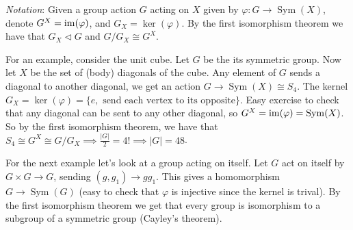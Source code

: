 \documentclass{article}
\newcommand{\nrm}{\triangleleft}
\DeclareMathOperator{\sym}{Sym}
\begin{document}
\par
\par \textit{Notation}: Given a group action $ G $ acting on $ X $ given by $ \varphi:G\to\sym(X) $, denote $ G^X=\operatorname{im}(\varphi) $, and $ G_X=\ker(\varphi) $. By the first isomorphism theorem we have that $ G_X\nrm G $ and $ G/G_X\cong G^X $.

\par
For an example, consider the unit cube. Let $ G $ be the its symmetric group. Now let $ X $ be the set of (body) diagonals of the cube. Any element of $ G $ sends a diagonal to another diagonal, we get an action $ G\to\sym(X)\cong S_4 $. The kernel $ G_X=\ker(\varphi)=\{e, \text{ send each vertex to its opposite} \} $. Easy exercise to check that any diagonal can be sent to any other diagonal, so $ G^X=\ima (\varphi)=\sym(X) $. So by the first isomorphism theorem, we have that $ S_4\cong G^X\cong G/G_X\implies \frac{|G|}2 = 4!\implies |G|=48 $.

\par
For the next example let's look at a group acting on itself. Let $ G $ act on itself by $ G\times G\to G $, sending $ (g,g_1)\to gg_1 $. This gives a homomorphism $ G\to \sym(G) $ (easy to check that $ \varphi $ is injective since the kernel is trival). By the first isomorphism theorem we get that every group is isomorphism to a subgroup of a symmetric group (Cayley's theorem).
\end{document}

